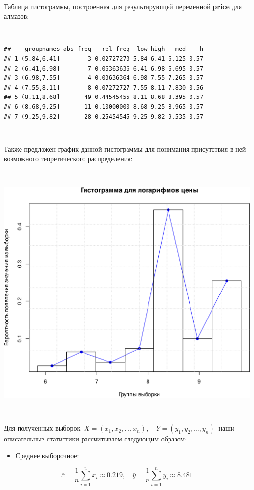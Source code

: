 \documentclass[
]{article}
\providecommand{\tightlist}{%
  \setlength{\itemsep}{0pt}\setlength{\parskip}{0pt}}
\begin{document}
\(\ \)

Таблица гистограммы, построенная для результирующей переменной
\textbf{price} для алмазов:

\(\ \)

\begin{verbatim}
##    groupnames abs_freq   rel_freq  low high   med    h
## 1 (5.84,6.41]        3 0.02727273 5.84 6.41 6.125 0.57
## 2 (6.41,6.98]        7 0.06363636 6.41 6.98 6.695 0.57
## 3 (6.98,7.55]        4 0.03636364 6.98 7.55 7.265 0.57
## 4 (7.55,8.11]        8 0.07272727 7.55 8.11 7.830 0.56
## 5 (8.11,8.68]       49 0.44545455 8.11 8.68 8.395 0.57
## 6 (8.68,9.25]       11 0.10000000 8.68 9.25 8.965 0.57
## 7 (9.25,9.82]       28 0.25454545 9.25 9.82 9.535 0.57
\end{verbatim}

\(\ \)

Также предложен график данной гистограммы для понимания присутствия в
ней возможного теоретического распределения:

\(\ \)

\begin{center}\includegraphics[width=0.6\linewidth]{Prac5_files/figure-latex/unnamed-chunk-8-1} \end{center}

\(\ \)

Для полученных выборок
\(\ X = (x_1, x_2, \dots, x_n), \quad Y = (y_1, y_2, \dots, y_n)\ \)
наши описательные статистики рассчитываем следующим образом:

\begin{itemize}
\tightlist
\item
  Среднее выборочное:
\end{itemize}

\[
\overline{x} = \frac{1}{n} \sum \limits_{i=1}^{n} x_i \approx 0.219, \quad \overline{y} = \frac{1}{n} \sum \limits_{i=1}^{n} y_i \approx 8.481
\]
\end{document}

